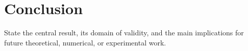\section{Conclusion}
\label{sec:conclusion}

State the central result, its domain of validity, and the main implications
for future theoretical, numerical, or experimental work.

